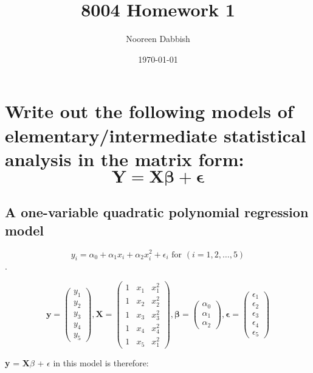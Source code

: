\documentclass[11pt]{article}
\title{8004 Homework 1}
\author{Nooreen Dabbish}
\date{\today}
\begin{document}
\maketitle



\section{Write out the following models of elementary/intermediate statistical analysis in the matrix form: $$ \mathbf{Y} = \mathbf{X\beta} +\mathbf{\epsilon} $$}
\label{sec-1}
\subsection{A one-variable quadratic polynomial regression model}
\label{sec-1-1}

$$y_i = \alpha_0 + \alpha_1x_i + \alpha_2 x_i^2 + \epsilon_i \textrm{ for }   (i = 1,2,\ldots,5)$$. 

$$\mathbf{y} = \begin{pmatrix} y_1 \\ y_2 \\ y_3
\\ y_4\\ y_5\end{pmatrix},
\mathbf{X}= \begin{pmatrix} 1 & x_1 & x_1^2 \\ 
                            1 & x_2 & x_2^2 \\ 
                            1 & x_3 & x_3^2 \\ 
                            1 & x_4 & x_4^2 \\ 
                            1 & x_5 & x_1^2 \end{pmatrix},
\mathbf{\beta} = \begin{pmatrix} \alpha_0 \\ \alpha_1 \\ \alpha_2
\end{pmatrix}, 
\mathbf{\epsilon} = \begin{pmatrix} \epsilon_1 \\ \epsilon_2 \\
\epsilon_3 \\ \epsilon_4 \\ \epsilon_5 \end{pmatrix}$$

\textbf{y} = \textbf{X$\beta$} + \textbf{$\epsilon$}  in this model is therefore:
\end{document}
